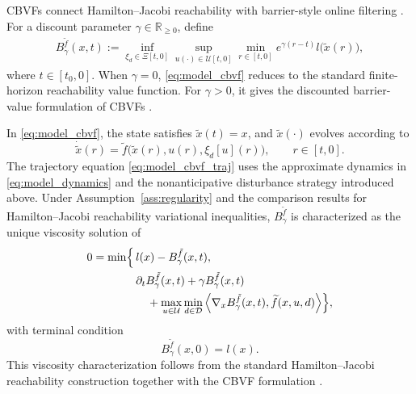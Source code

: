 \documentclass[letterpaper,10pt,conference]{ieeeconf}
\newcommand{\R}{\mathbb{R}}
\newcommand{\Bm}{B_{\gamma}^{\tilde f}}
\newcommand{\fapp}{\widetilde{f}}
\newcommand{\xv}{x}
\newcommand{\uv}{u}
\newcommand{\dv}{d}
\newcommand{\Uv}{\mathcal{U}}
\newcommand{\Dv}{\mathcal{D}}
\newcommand{\Xiv}{\Xi}
\newcommand{\ip}[2]{\left\langle #1,#2 \right\rangle}
\begin{document}
CBVFs connect Hamilton--Jacobi reachability with barrier-style online filtering
\cite{choi2021cbvf}. For a discount parameter $\gamma\in\R_{\ge 0}$, define
\begin{equation}
\begin{aligned}
    \Bm(\xv,t)
    :=
    \inf_{\xi_{\dv}\in\Xiv[t,0]}
    \sup_{\uv(\cdot)\in\Uv[t,0]}
    \min_{r\in[t,0]}
    e^{\gamma(r-t)}l\bigl(\tilde{\xv}(r)\bigr),
\end{aligned}
\label{eq:model_cbvf}
\end{equation}
where $t\in[t_0,0]$. When $\gamma=0$, \eqref{eq:model_cbvf} reduces to the
standard finite-horizon reachability value function. For $\gamma>0$, it gives
the discounted barrier-value formulation of CBVFs \cite{choi2021cbvf}.

In \eqref{eq:model_cbvf}, the state satisfies $\tilde{\xv}(t)=\xv$, and
$\tilde{\xv}(\cdot)$ evolves according to
\begin{equation}
    \dot{\tilde{\xv}}(r)
    =
    \fapp\bigl(
    \tilde{\xv}(r),
    \uv(r),
    \xi_{\dv}[\uv](r)
    \bigr),
    \qquad r\in[t,0].
    \label{eq:model_cbvf_traj}
\end{equation}
The trajectory equation \eqref{eq:model_cbvf_traj} uses the approximate
dynamics in \eqref{eq:model_dynamics} and the nonanticipative disturbance
strategy introduced above. Under Assumption~\ref{ass:regularity} and the
comparison results for Hamilton--Jacobi reachability variational inequalities,
$\Bm$ is characterized as the unique viscosity solution of
\begin{equation}
\label{eq:model_cbvf_vi}
\begin{aligned}
0=\min\Bigl\{\, &l(\xv)-\Bm(\xv,t),\\
&\partial_t \Bm(\xv,t) + \gamma \Bm(\xv,t) \\
&\quad + \max_{\uv\in\Uv}\min_{\dv\in\Dv}
\ip{\nabla_{\xv}\Bm(\xv,t)}{\fapp(\xv,\uv,\dv)}
\Bigr\},
\end{aligned}
\end{equation}
with terminal condition
\begin{equation}
    \Bm(\xv,0)=l(\xv).
    \label{eq:model_cbvf_terminal}
\end{equation}
This viscosity characterization follows from the standard Hamilton--Jacobi
reachability construction together with the CBVF formulation
\cite{mitchell2005time,choi2021cbvf}.
\end{document}
